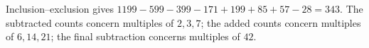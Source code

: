 Inclusion--exclusion gives $1199-599-399-171+199+85+57-28=\boxed{343}$. The subtracted counts concern multiples of $2,3,7$; the added counts concern multiples of $6,14,21$; the final subtraction concerns multiples of $42$.
